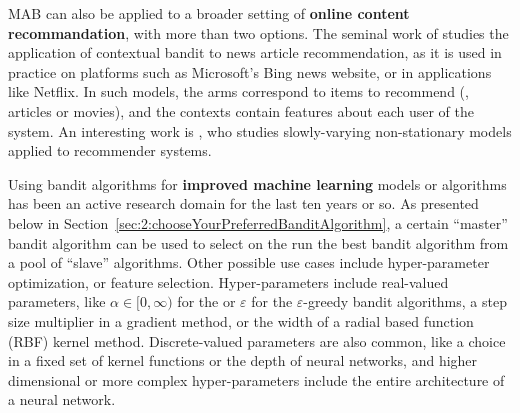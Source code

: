     MAB can also be applied to a broader setting of \textbf{online content recommandation},
    with more than two options.
    The seminal work of \cite{Li10} studies the application of contextual bandit to news article recommendation, as it is used in practice on platforms such as Microsoft's Bing news website,
    or in applications like Netflix.
    In such models, the arms correspond to items to recommend (\eg, articles or movies), and the contexts contain features about each user of the system.
    An interesting work is \cite{Louedec16}, who studies slowly-varying non-stationary models applied to recommender systems.

    Using bandit algorithms for \textbf{improved machine learning} models or algorithms has been an active research domain for the last ten years or so.
    As presented below in Section~\ref{sec:2:chooseYourPreferredBanditAlgorithm}, a certain ``master'' bandit algorithm can be used to select on the run the best bandit algorithm from a pool of ``slave'' algorithms.
    Other possible use cases include hyper-parameter optimization, or feature selection.
    Hyper-parameters include real-valued parameters, like $\alpha\in[0,\infty)$ for the \UCB{} or $\varepsilon$ for the $\varepsilon$-greedy bandit algorithms, a step size multiplier in a gradient method, or the width of a radial based function (RBF) kernel method.
    Discrete-valued parameters are also common, like a choice in a fixed set of kernel functions or the depth of neural networks,
    and higher dimensional or more complex hyper-parameters include the entire architecture of a neural network.


